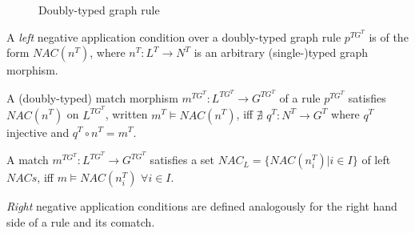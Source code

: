 \begin{figure}[!ht]
  \centering
  \caption{Doubly-typed graph rule}\label{fig:process:doubly-typed-graph-rule}
\end{figure}

\begin{definition} A \emph{left} negative application condition over a doubly-typed graph rule $p^{TG^T}$ is of the form $NAC(n^T)$, where $n^T : L^T \rightarrow N^T$ is an arbitrary (single-)typed graph morphism. 
 
A (doubly-typed) match morphism $m^{TG^T} : L^{TG^T} \rightarrow G^{TG^T}$ of a rule $p^{TG^T}$ satisfies $NAC(n^T)$ on $L^{TG^T}$, written \mbox{$m^T \models NAC(n^T)$}, iff $\nexists$ $q^T : N^T \rightarrow G^T$ where $q^T$ injective and $q^T \circ n^T = m^T$.


  A match $m^{TG^T} : L^{TG^T} \rightarrow G^{TG^T}$ satisfies a set \mbox{$NAC_L = \{NAC\left(n^T_i\right)|i \in I\}$} of left $NACs$, iff \mbox{$m \models NAC\left(n^T_i\right)$} $\forall i \in I$.

\emph{Right} negative application conditions are defined analogously for the right hand side of a rule and its comatch.
\end{definition}

